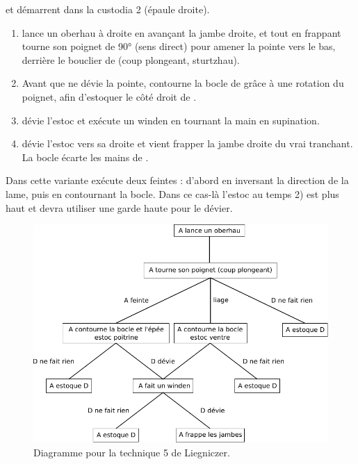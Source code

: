 \begin{technique}
\label{épée-bocle:tech:liegniczer:5v}

\A et \D démarrent dans la custodia 2 (épaule droite).

\begin{enumerate}
	\item \A lance un oberhau à droite en avançant la jambe droite, et tout en frappant tourne son poignet de 90° (sens direct) pour amener la pointe vers le bas, derrière le bouclier de \D (coup plongeant, sturtzhau).
	
	\item Avant que \D ne dévie la pointe, \A contourne la bocle de \D grâce à une rotation du poignet, afin d'estoquer le côté droit de \D.
	
	\item {}
		\D dévie l'estoc et \A exécute un winden en tournant la main en supination.
	
	\item {}
		\D dévie l'estoc vers sa droite et \A vient frapper la jambe droite du vrai tranchant.
		La bocle écarte les mains de \D.
\end{enumerate}

Dans cette variante \A exécute deux feintes : d'abord en inversant la direction de la lame, puis en contournant la bocle.
Dans ce cas-là l'estoc au temps 2) est plus haut et \D devra utiliser une garde haute pour le dévier.

\end{technique}

\begin{figure}[htp]
	\centering
	\includegraphics{diagrammes/epee_bocle/liegniczer_5}
	\caption{Diagramme pour la technique 5 de Liegniczer.}
	\label{épée-bocle:fig:liegniczer:diagramme-5}
\end{figure}


